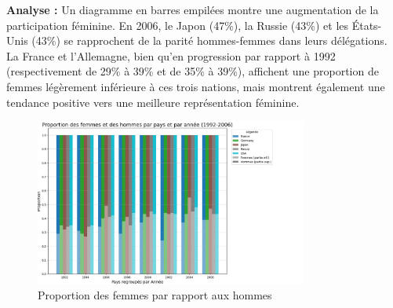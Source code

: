 \documentclass[fontsize=10pt,oneside]{scrreprt}
\begin{document}
\textbf{Analyse :} Un diagramme en barres empilées montre une augmentation de la participation féminine. En 2006, le Japon (47\%), la Russie (43\%) et les États-Unis (43\%) se rapprochent de la parité hommes-femmes dans leurs délégations. La France et l'Allemagne, bien qu'en progression par rapport à 1992 (respectivement de 29\% à 39\% et de 35\% à 39\%), affichent une proportion de femmes légèrement inférieure à ces trois nations, mais montrent également une tendance positive vers une meilleure représentation féminine.
\begin{figure}[H]
    \centering
    \includegraphics[width=0.8\textwidth]{charts/3biv.png}
    \caption{Proportion des femmes par rapport aux hommes}
    \label{fig:prop_femmes_hommes}
\end{figure}
\end{document}
